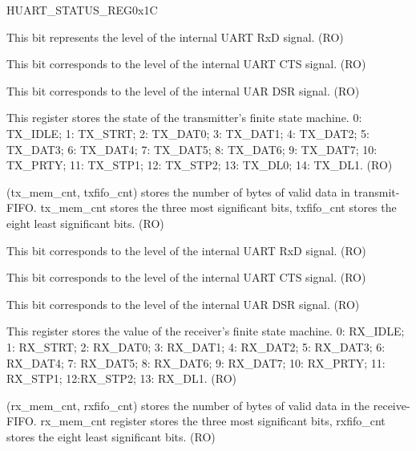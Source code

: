 \begin{register}{H}{UART\_STATUS\_REG}{0x1C}\label{regdesc:UARTSTATUSREG}
%
%
%
%
%
%
%
%
%
%
%
%
\regnewline%
\begin{regdesc}\begin{reglist}
\item [UART\_TXD]This bit represents the level of the internal UART RxD signal. (RO)
\item [UART\_RTSN]This bit corresponds to the level of the internal UART CTS signal. (RO)
\item [UART\_DTRN]This bit corresponds to the level of the internal UAR DSR signal. (RO)
\item [UART\_ST\_UTX\_OUT]This register stores the state of the transmitter's finite state machine. 0: TX\_IDLE; 1: TX\_STRT; 2: TX\_DAT0; 3: TX\_DAT1; 4: TX\_DAT2; 5: TX\_DAT3; 6: TX\_DAT4; 7: TX\_DAT5; 8: TX\_DAT6; 9: TX\_DAT7; 10: TX\_PRTY; 11: TX\_STP1; 12: TX\_STP2; 13: TX\_DL0;  14: TX\_DL1. (RO)
\item [UART\_TXFIFO\_CNT]\label{UARTTXFIFOCNT}(tx\_mem\_cnt, txfifo\_cnt) stores the number of bytes of valid data in transmit-FIFO. tx\_mem\_cnt stores the three most significant bits, txfifo\_cnt stores the eight least significant bits. (RO)
\item [UART\_RXD]This bit corresponds to the level of the internal UART RxD signal. (RO)
\item [UART\_CTSN]This bit corresponds to the level of the internal UART CTS signal. (RO)
\item [UART\_DSRN]This bit corresponds to the level of the internal UAR DSR signal. (RO)
\item [UART\_ST\_URX\_OUT]This register stores the value of the receiver's finite state machine. 0: RX\_IDLE; 1: RX\_STRT; 2: RX\_DAT0; 3: RX\_DAT1; 4: RX\_DAT2; 5: RX\_DAT3; 6: RX\_DAT4; 7: RX\_DAT5; 8: RX\_DAT6; 9: RX\_DAT7; 10: RX\_PRTY; 11: RX\_STP1; 12:RX\_STP2; 13: RX\_DL1. (RO)
\item [UART\_RXFIFO\_CNT]\label{UARTRXFIFOCNT}(rx\_mem\_cnt, rxfifo\_cnt) stores the number of bytes of valid data in the receive-FIFO. rx\_mem\_cnt register stores the three most significant bits, rxfifo\_cnt stores the eight least significant bits. (RO)
\end{reglist}\end{regdesc}
\end{register}

